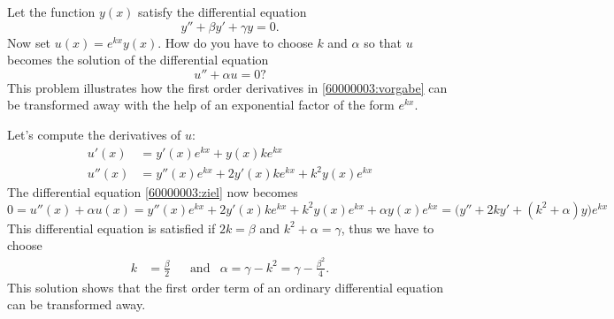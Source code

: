 Let the function
$y(x)$
satisfy the differential equation
\begin{equation}
y''+\beta y' + \gamma y=0.
\label{60000003:vorgabe}
\end{equation}
Now set
$u(x)=e^{k x}y(x)$.
How do you have to choose $k$ and $\alpha$ so that $u$ becomes the solution
of the differential equation
\begin{equation}
u''+\alpha u=0?
\label{60000003:ziel}
\end{equation}
This problem illustrates how the first order derivatives in
\eqref{60000003:vorgabe}
can be transformed away with the help of an exponential factor
of the form $e^{kx}$.

\begin{loesung}
Let's compute the derivatives of $u$:
\begin{align*}
u'(x)&=y'(x)e^{kx}+y(x)ke^{kx}\\
u''(x)&=y''(x)e^{kx}+2y'(x)ke^{kx}+k^2y(x)e^{kx}
\end{align*}
The differential equation 
\eqref{60000003:ziel} now becomes
\[
0
=
u''(x)+\alpha u(x)
=
y''(x)e^{kx}+2y'(x)ke^{kx}+k^2y(x)e^{kx}
+ \alpha y(x)e^{kx}
=
\bigl(
y''+2k y' +(k^2+\alpha)y
\bigr)
e^{kx}
\]
This differential equation is satisfied if 
$2k=\beta$ and
$k^2+\alpha=\gamma$, thus we have to choose
\[
\begin{aligned}
k&=\frac{\beta}2
&
&\text{and}&
\alpha=\gamma-k^2=\gamma-\frac{\beta^2}4.
\end{aligned}
\]
This solution shows that the first order term of an ordinary differential
equation can be transformed away.
\end{loesung}

